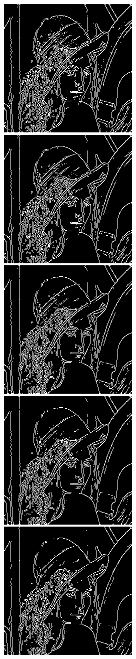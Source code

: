 \documentclass{ee208report}
\begin{document}
\begin{figure}[H]
    \centering
    \includegraphics[width=0.35\linewidth]{images/high_threshold/60.png}
    \includegraphics[width=0.35\linewidth]{images/high_threshold/70.png}
    \includegraphics[width=0.35\linewidth]{images/high_threshold/80.png}
    \includegraphics[width=0.35\linewidth]{images/high_threshold/90.png}
    \includegraphics[width=0.35\linewidth]{images/high_threshold/100.png}

\end{figure}
\end{document}

